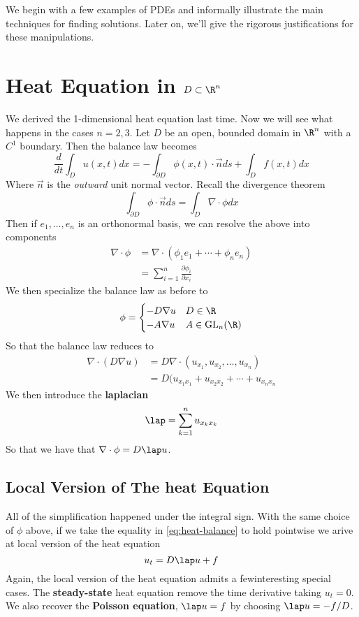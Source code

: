 \documentclass{bkcnotes}
\begin{document}
\maketitle

We begin with a few examples of PDEs and informally illustrate the
main techniques for finding solutions. Later on, we'll give the
rigorous justifications for these manipulations. 

\section{Heat Equation in $D \subset \R^n$}
We derived the 1-dimensional heat equation last time. Now we will see
what happens in the cases $n=2,3$. Let $D$ be an open, bounded domain
in $\R^n$ with a $C^1$ boundary. Then the balance law becomes
\begin{equation}
  \label{eq:heat-balance}
  \frac{d}{dt}\int_{D} u(x,t)dx =
  -\int_{\partial D} \phi(x,t) \cdot \vec{n}ds + \int_{D}f(x,t)dx
\end{equation}
Where $\vec{n}$ is the \textit{outward} unit normal vector. Recall the
divergence theorem
\[
\int_{\partial D} \phi \cdot \vec{n}ds =
\int_{D} \nabla \cdot \phi dx
\]
Then if $e_1,\ldots,e_n$ is an orthonormal basis, we can resolve the
above into components
\begin{align*}
  \nabla \cdot \phi &= \nabla \cdot (\phi_1e_1 + \cdots + \phi_ne_n) \\
  &= \sum_{i=1}^n \frac{\partial \phi_i}{\partial x_i}
\end{align*}
We then specialize the balance law as before to
\[
\phi =
\begin{cases}
  -D\nabla u & D \in \R \\
  -A\nabla u & A \in \text{GL}_n(\R)
\end{cases}
\]
So that the balance law reduces to
\begin{align*}
  \nabla \cdot (D\nabla u) &= D \nabla \cdot (u_{x_1},u_{x_2}, \ldots, u_{x_n}) \\
  &= D (u_{x_1x_1} + u_{x_2x_2} + \cdots + u_{x_nx_n}
\end{align*}
We then introduce the \textbf{laplacian}
\[
\lap = \sum_{k=1}^n u_{x_kx_k}
\]
So that we have that $\nabla \cdot \phi = D \lap u$.

\subsection{Local Version of The heat Equation}
All of the simplification happened under the integral sign. With the
same choice of $\phi$ above, if we take the equality in
\eqref{eq:heat-balance} to hold pointwise we arive at local version of
the heat equation
\begin{equation}
  \label{eq:heat}
  u_t = D\lap u + f
\end{equation}
Again, the local version of the heat equation admits a fewinteresting
special cases. The \textbf{steady-state} heat equation remove the time
derivative taking $u_t = 0$. We also recover the \textbf{Poisson
  equation}, $\lap u = f$ by choosing $\lap u = -f / D$.
\end{document}
